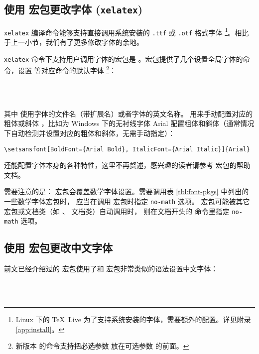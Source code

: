 \subsection{使用  宏包更改字体 (\texttt{xelatex})}\label{subsec:fontspec}

\texttt{xelatex} 编译命令能够支持直接调用系统安装的 \texttt{.ttf} 或 \texttt{.otf} 格式字体%
\footnote{Linux 下的 \TeX\ Live 为了支持系统安装的字体，需要额外的配置。详见附录 \ref{app:install}。}。相比于上一小节，我们有了更多修改字体的余地。

\texttt{xelatex} 命令下支持用户调用字体的宏包是 。宏包提供了几个设置全局字体的命令，设置  等对应命令的默认字体%
\footnote{新版本  的命令支持把必选参数  放在可选参数  的前面。}：
\begin{command}
 \\
 \\
\end{command}
其中  使用字体的文件名（带扩展名）或者字体的英文名称。 用来手动配置对应的粗体或斜体
，比如为 Windows 下的无衬线字体 Arial 配置粗体和斜体（通常情况下自动检测并设置对应的粗体和斜体，无需手动指定）：
\begin{verbatim}
\setsansfont[BoldFont={Arial Bold}, ItalicFont={Arial Italic}]{Arial}
\end{verbatim}
 还能配置字体本身的各种特性，这里不再赘述，感兴趣的读者请参考  宏包的帮助文档。

需要注意的是： 宏包会覆盖数学字体设置。需要调用表 \ref{tbl:font-pkgs} 中列出的一些数学字体宏包时，
应当在调用  宏包时指定 \texttt{no-math} 选项。 宏包可能被其它宏包或文档类（如 、 文档类）自动调用时，
则在文档开头的  命令里指定 \texttt{no-math} 选项。

\subsection{使用  宏包更改中文字体}\label{subsec:CJKfont}

前文已经介绍过的  宏包使用了和  宏包非常类似的语法设置中文字体：
\begin{command}
 \\
 \\
\end{command}

